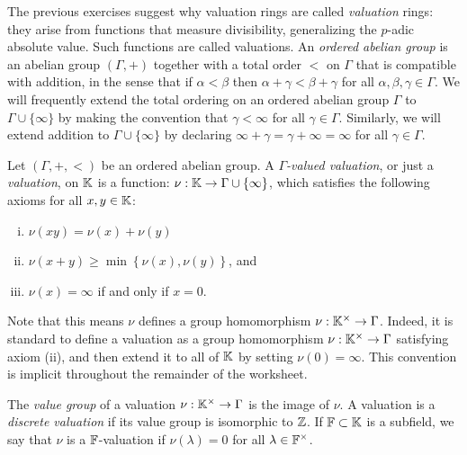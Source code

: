 \documentclass[12pt,reqno]{amsart}
\begin{document}
\hrulefill

The previous exercises suggest why valuation rings are called \emph{valuation} rings: they arise from functions that measure divisibility, generalizing the $p$-adic absolute value. Such functions are called valuations. An \emph{ordered abelian group} is an abelian group $(\Gamma,+)$ together with a total order $<$ on $\Gamma$ that is compatible with addition, in the sense that if $\alpha<\beta$ then  $\alpha+\gamma<\beta+\gamma$ for all $\alpha,\beta,\gamma \in \Gamma$.   We will frequently extend the total ordering on an ordered abelian group $\Gamma$ to $\Gamma \cup \{\infty\}$ by making the convention that $\gamma < \infty$ for all $\gamma \in \Gamma$. Similarly, we will extend addition to $\Gamma\cup\{\infty\}$ by declaring $\infty + \gamma = \gamma + \infty = \infty$ for all $\gamma \in \Gamma$.

\begin{definition}
Let $(\Gamma,+,<)$ be an ordered abelian group. A  \emph{$\Gamma$-valued valuation}, or just a \emph{valuation}, on $\mathbb{K}$ is a function: $\nu:\mathbb{K} \to \Gamma\cup\{\infty\}$, which satisfies the following axioms for all $x,y\in \mathbb{K}$:
\begin{enumerate}[(i)]
\item $\nu(xy) = \nu(x) + \nu(y)$
\item $\nu(x + y) \geq \min\left\{ \nu(x), \nu(y)\right\}$, and
\item $\nu(x) = \infty$ if and only if $x=0$.
\end{enumerate}
\end{definition}

Note that this means $\nu$ defines a group homomorphism $\nu:\mathbb{K}^{\times} \to \Gamma$. Indeed, it is standard to define a valuation as a group homomorphism $\nu: \mathbb{K}^{\times} \to \Gamma$ satisfying axiom (ii), and then extend it to all of $\mathbb{K}$ by setting $\nu(0)=\infty$. This convention is implicit throughout the remainder of the worksheet. 

The \emph{value group} of a valuation $\nu:\mathbb{K}^{\times} \to \Gamma$ is the image of $\nu$. A valuation is a \emph{discrete valuation} if its value group is isomorphic to $\mathbb{Z}$. If $\mathbb{F} \subset \mathbb{K}$ is a subfield, we say that $\nu$ is a $\mathbb{F}$-valuation if $\nu(\lambda) = 0 $ for all $\lambda \in \mathbb{F}^{\times}$.

\hrulefill
\end{document}
